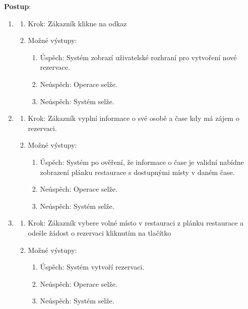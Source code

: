 \textbf{Postup}:
\begin{enumerate}
	\item 
	\begin{enumerate}
		\item Krok: Zákazník klikne na odkaz  
		\item Možné výstupy:
		\begin{enumerate}
			\item Úspěch: Systém zobrazí uživatelské rozhraní pro vytvoření nové rezervace.
			\item Neúspěch: Operace selže. 
			\item Neúspěch: Systém selže. 
		\end{enumerate} 
	\end{enumerate}

	\item 
	\begin{enumerate}
		\item Krok: Zákazník vyplní informace o své osobě a čase kdy má zájem o rezervaci. 
		\item Možné výstupy:
		\begin{enumerate}
			\item Úspěch: Systém po ověření, že informace o čase je validní nabídne zobrazení plánku restaurace s dostupnými místy v daném čase.
			\item Neúspěch: Operace selže.
			\item Neúspěch: Systém selže.
		\end{enumerate} 
	\end{enumerate}

	\item 
	\begin{enumerate}
		\item Krok: Zákazník vybere volné místo v restauraci z plánku restaurace a odešle žádost o rezervaci kliknutím na tlačítko 
		\item Možné výstupy:
		\begin{enumerate}
			\item Úspěch: Systém vytvoří rezervaci.
			\item Neúspěch: Operace selže.
			\item Neúspěch: Systém selže.
		\end{enumerate} 
	\end{enumerate}


\end{enumerate}
